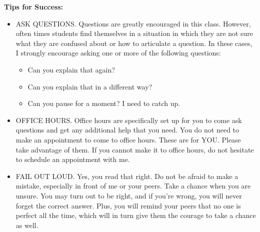 \documentclass[12pt]{article}
\newcommand{\tbf}[1]{\noindent\textbf{#1}}
\begin{document}
\vspace{0.5cm}
\tbf{Tips for Success:} 
\noindent\begin{itemize} 
\item ASK QUESTIONS. Questions are greatly encouraged in this class. However, often times students find themselves in a situation in which they are not sure what they are confused about or how to articulate a question. In these cases, I strongly encourage asking one or more of the following questions:
\begin{itemize}
\item Can you explain that again?
\item Can you explain that in a different way?
\item Can you pause for a moment? I need to catch up.
\end{itemize}
\item OFFICE HOURS. Office hours are specifically set up for you to come ask questions and get any additional help that you need. You do not need to make an appointment to come to office hours. These are for YOU. Please take advantage of them. If you cannot make it to office hours, do not hesitate to schedule an appointment with me.
\item FAIL OUT LOUD. Yes, you read that right. Do not be afraid to make a mistake, especially in front of me or your peers. Take a chance when you are unsure. You may turn out to be right, and if you're wrong, you will never forget the correct answer. Plus, you will remind your peers that no one is perfect all the time, which will in turn give them the courage to take a chance as well.
\end{itemize}
\end{document}
